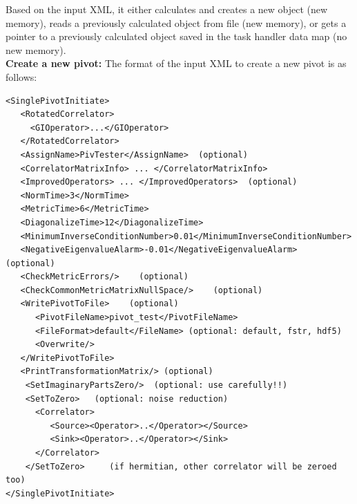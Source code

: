 \documentclass[12pt]{article}
\begin{document}
Based on the input XML, it either calculates and creates a new object (new memory),
reads a previously calculated object from file (new memory), or gets a pointer to
a previously calculated object saved in the task handler data map (no new memory).
\\[5mm]\noindent
\textbf{Create a new pivot:}\newline
The format of the input XML to create a new pivot is as follows:                                              
\begin{verbatim}
<SinglePivotInitiate>
   <RotatedCorrelator>
     <GIOperator>...</GIOperator>
   </RotatedCorrelator>
   <AssignName>PivTester</AssignName>  (optional)
   <CorrelatorMatrixInfo> ... </CorrelatorMatrixInfo>
   <ImprovedOperators> ... </ImprovedOperators>  (optional)
   <NormTime>3</NormTime>
   <MetricTime>6</MetricTime>
   <DiagonalizeTime>12</DiagonalizeTime>
   <MinimumInverseConditionNumber>0.01</MinimumInverseConditionNumber>
   <NegativeEigenvalueAlarm>-0.01</NegativeEigenvalueAlarm>  (optional)
   <CheckMetricErrors/>    (optional)
   <CheckCommonMetricMatrixNullSpace/>    (optional)
   <WritePivotToFile>    (optional)
      <PivotFileName>pivot_test</PivotFileName>
      <FileFormat>default</FileName> (optional: default, fstr, hdf5)
      <Overwrite/>
   </WritePivotToFile>
   <PrintTransformationMatrix/> (optional)
    <SetImaginaryPartsZero/>  (optional: use carefully!!)                   
    <SetToZero>   (optional: noise reduction)                               
      <Correlator>                                                          
         <Source><Operator>..</Operator></Source>                           
         <Sink><Operator>..</Operator></Sink>                               
      </Correlator>                                                         
    </SetToZero>     (if hermitian, other correlator will be zeroed too)    
</SinglePivotInitiate>
\end{verbatim}
\end{document}
